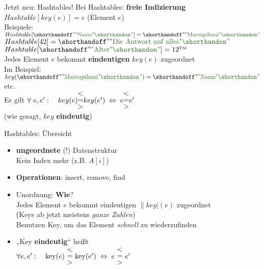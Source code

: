 \begin{frame}{Jetzt neu: Hashtables!}  %
	\Impl Bei Hashtables: \textbf{freie Indizierung} \\ 
	$Hashtable[key(e)] = e$ \quad (Element $e$) \\
	Beispiele: \\
	$Hashtable[\str{Name}] = \str{Marsupilami}$ \\
	$Hashtable[42] = \str{Die Antwort auf alles}$ \\
	$Hashtable[\str{Alter}] = 12\TM$ \\
	\pause \forcenewline
	\impl Jedes Element $e$ bekommt \textbf{eindeutigen} $key(e)$ zugeordnet \\
	Im Beispiel: \\
	$key(\str{Marsupilami}) = \str{Name}$ \quad etc.
	\pause \\ \forcenewline
	Es gilt
	$\forall\; e, e': \quad key(e) \stackedtight{< \\ = \\ >} key(e') \gdw e \stackedtight{< \\ = \\ >} e'$ \\ (wie gesagt, $key$ \textbf{eindeutig})
\end{frame}
\fi


\def\key{\|key|}

\begin{frame}{Hashtables: Übersicht}
	\begin{itemize} 
			\item \textbf{ungeordnete} (!) Datenstruktur \\
			\impl Kein Index mehr (z.B. $A[i]$) 
			\pause
			\item \textbf{Operationen}: insert, remove, find
			\forcenewline \pause
			\item Unordnung: \textbf{Wie}? \\
				\§{\impl} Jedes Element $e$ bekommt eindeutigen $\key(e)$ zugeordnet \\
				\. {\small (Keys ab jetzt meistens \textit{ganze Zahlen})} \\
			\impl Benutzen Key, um das Element \emph{schnell} zu wiederzufinden
			\pause
			\item „Key \textbf{eindeutig}“ heißt \\
			$\forall e, e': \quad \key(e) \ \stackedtight{< \\ = \\ >}\ \key(e') \gdw e \ \stackedtight{< \\ = \\ >} \ e'$ \\
	\end{itemize} 
\end{frame}

